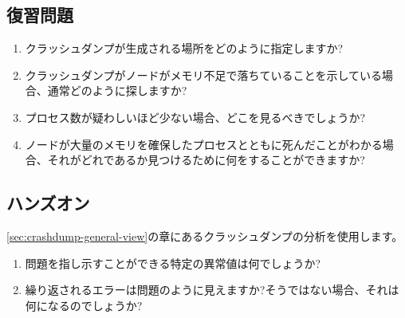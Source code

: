 \subsection*{復習問題}

\begin{enumerate}
	\item クラッシュダンプが生成される場所をどのように指定しますか?
	\item クラッシュダンプがノードがメモリ不足で落ちていることを示している場合、通常どのように探しますか?
	\item プロセス数が疑わしいほど少ない場合、どこを見るべきでしょうか?
	\item ノードが大量のメモリを確保したプロセスとともに死んだことがわかる場合、それがどれであるか見つけるために何をすることができますか?\end{enumerate}

\subsection*{ハンズオン}

\ref{sec:crashdump-general-view}の章にあるクラッシュダンプの分析を使用します。

\begin{enumerate}
	\item 問題を指し示すことができる特定の異常値は何でしょうか?
	\item 繰り返されるエラーは問題のように見えますか?そうではない場合、それは何になるのでしょうか?
\end{enumerate}

